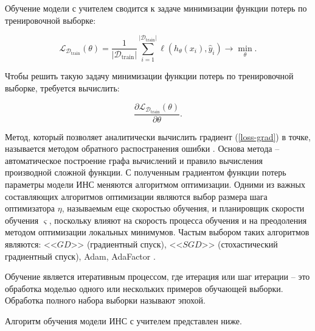 Обучение модели с учителем сводится к задаче минимизации функции потерь по тренировочной выборке:

\begin{equation}
    \mathcal{L}_{\mathcal{D}_{\text{train}}}(\theta) = \frac{1}{\lvert \mathcal{D}_{\text{train}} \rvert}\sum_{i=1}^{\lvert \mathcal{D}_{\text{train}} \rvert}\ell(h_{\theta}(x_i),\hat y_i) \rightarrow \min_{\theta}.
\end{equation}

Чтобы решить такую задачу минимизации функции потерь по тренировочной выборке, требуется вычислить:

\begin{equation}
    \frac{\partial \mathcal{L}_{\mathcal{D}_{\text{train}}}(\theta)}{\partial \theta}.
    \label{loss-grad}
\end{equation}

Метод, который позволяет аналитически вычислить градиент (\ref{loss-grad}) в точке, называется методом обратного распостранения ошибки \cite{backprop-theory}. Основа метода -- автоматическое построение графа вычислений и правило вычисления производной сложной функции. С полученным градиентом функции потерь параметры модели ИНС меняются алгоритмом оптимизации. Одними из важных составляющих алгоритмов оптимизации являются выбор размера шага оптимизатора $\eta$, называемым еще скоростью обучения, и планировщик скорости обучения $\varsigma$, поскольку влияют на скорость процесса обучения и на преодоления методом оптимизации локальных минимумов. Частым выбором таких алгоритмов являются: <<$GD$>> (градиентный спуск), <<$SGD$>> (стохастический градиентный спуск), Adam, AdaFactor \cite{optimizers-paper,adafactor-paper}.

Обучение является итеративным процессом, где итерация или шаг итерации -- это обработка моделью одного или нескольких примеров обучающей выборки. Обработка полного набора выборки называют эпохой.

Алгоритм обучения модели ИНС с учителем представлен ниже.

